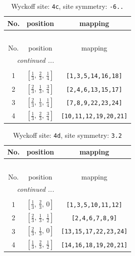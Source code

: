 \documentclass[fleqn,8pt]{jsarticle}
\begin{document}
\renewcommand{\arraystretch}{1.2}
\begin{longtable}{ccc}
\caption{Wyckoff site: {\tt 4c}, site symmetry: {\tt -6..}}
 \\
 \hline \hline
No. & position & mapping \\ \hline \endfirsthead

\multicolumn{2}{l}{\tablename\ \thetable{}} \\
 \hline \hline
No. & position & mapping \\ \hline \endhead

 \hline \hline
\multicolumn{2}{r}{\footnotesize\it continued ...} \\ \endfoot

 \hline \hline
\multicolumn{2}{r}{} \\ \endlastfoot

1 & $\left[ \frac{1}{3},\, \frac{2}{3},\, \frac{1}{4} \right]$ & {\tt [1,3,5,14,16,18]} \\ \hline
2 & $\left[ \frac{2}{3},\, \frac{1}{3},\, \frac{3}{4} \right]$ & {\tt [2,4,6,13,15,17]} \\ \hline
3 & $\left[ \frac{2}{3},\, \frac{1}{3},\, \frac{1}{4} \right]$ & {\tt [7,8,9,22,23,24]} \\ \hline
4 & $\left[ \frac{1}{3},\, \frac{2}{3},\, \frac{3}{4} \right]$ & {\tt [10,11,12,19,20,21]} \\
\end{longtable}
\renewcommand{\arraystretch}{1.2}
\begin{longtable}{ccc}
\caption{Wyckoff site: {\tt 4d}, site symmetry: {\tt 3.2}}
 \\
 \hline \hline
No. & position & mapping \\ \hline \endfirsthead

\multicolumn{2}{l}{\tablename\ \thetable{}} \\
 \hline \hline
No. & position & mapping \\ \hline \endhead

 \hline \hline
\multicolumn{2}{r}{\footnotesize\it continued ...} \\ \endfoot

 \hline \hline
\multicolumn{2}{r}{} \\ \endlastfoot

1 & $\left[ \frac{1}{3},\, \frac{2}{3},\, 0 \right]$ & {\tt [1,3,5,10,11,12]} \\ \hline
2 & $\left[ \frac{2}{3},\, \frac{1}{3},\, \frac{1}{2} \right]$ & {\tt [2,4,6,7,8,9]} \\ \hline
3 & $\left[ \frac{2}{3},\, \frac{1}{3},\, 0 \right]$ & {\tt [13,15,17,22,23,24]} \\ \hline
4 & $\left[ \frac{1}{3},\, \frac{2}{3},\, \frac{1}{2} \right]$ & {\tt [14,16,18,19,20,21]} \\
\end{longtable}
\end{document}
